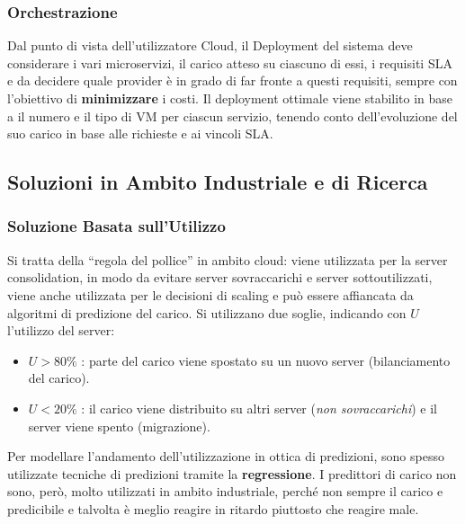 \documentclass{article}
\providecommand{\tightlist}{%
		  \setlength{\itemsep}{0pt}\setlength{\parskip}{0pt}}
\begin{document}
		\subsubsection{Orchestrazione}\label{orchestrazione}
		
		Dal punto di vista dell'utilizzatore Cloud, il Deployment del sistema deve considerare i vari
		microservizi, il carico atteso su ciascuno di essi, i requisiti SLA e da decidere quale provider è in grado di far fronte a questi requisiti, sempre con l'obiettivo di \textbf{minimizzare} i costi. Il deployment ottimale viene stabilito in base a  il numero e il tipo di	VM per ciascun servizio, tenendo conto dell'evoluzione del
		suo carico in base alle richieste e ai vincoli SLA.
		
		\subsection{Soluzioni in Ambito Industriale e di Ricerca}\label{soluzioni-in-ambito-industriale-e-di-ricerca}
		\subsubsection{Soluzione Basata sull'Utilizzo}\label{soluzione-basata-sullutilizzo}
		
		Si tratta della ``regola del pollice'' in ambito cloud: viene utilizzata
		per la server consolidation, in modo da evitare
		server sovraccarichi e server sottoutilizzati, viene
		anche utilizzata per le decisioni di scaling e può
		essere affiancata da algoritmi di predizione del carico.
		Si utilizzano due soglie, indicando con \(U\) l'utilizzo
		del server:
		
		\begin{itemize}
		\tightlist
		\item
		  \(U > 80\%\) : parte del carico viene spostato su un nuovo server
		  (bilanciamento del carico).
		\item
		  \(U < 20\%\) : il carico viene distribuito su altri server (\emph{non
		  sovraccarichi}) e il server viene spento (migrazione).
		\end{itemize}
		Per modellare l'andamento dell'utilizzazione in ottica di predizioni, sono spesso utilizzate tecniche di predizioni tramite la \textbf{regressione}.
		I predittori di carico non sono, però, molto utilizzati in ambito industriale,
		perché non sempre il carico e predicibile e talvolta è
		meglio reagire in ritardo piuttosto che reagire male. 
		
\end{document}
